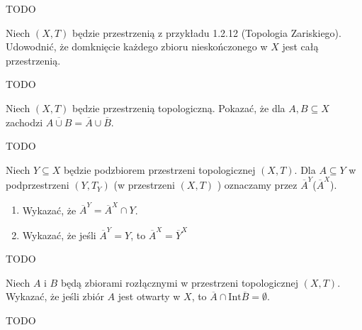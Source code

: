 \begin{solution}
	TODO
\end{solution} 
\begin{problem}[1.20]
	Niech $\left( X, T \right) $ będzie przestrzenią z przykładu 1.2.12 (Topologia Zariskiego). Udowodnić, że domknięcie każdego zbioru nieskończonego w $X$ jest całą przestrzenią.
\end{problem} 
\begin{solution}
	TODO
\end{solution} 
\begin{problem}[1.21]
	Niech $\left( X,T \right) $ będzie przestrzenią topologiczną. Pokazać, że dla $A,B \subseteq X$ zachodzi $\overline{A\cup B} = \overline{A} \cup \overline{B}$.
\end{problem} 
\begin{solution}
	TODO
\end{solution} 
\begin{problem}[1.22]
	Niech $Y \subseteq X$ będzie podzbiorem przestrzeni topologicznej $\left( X,T \right) $. Dla $A \subseteq Y$ w podprzestrzeni $\left( Y, T_{Y} \right) $ (w przestrzeni $\left( X,T \right) $ ) oznaczamy przez $\overline{A}^{Y}$($\overline{A}^{X}$).
	\begin{enumerate}[label=\alph*)]
		\item Wykazać, że $\overline{A}^{Y} = \overline{A}^{X}\cap Y$.
		\item Wykazać, że jeśli $\overline{A}^{Y} = Y$, to $\overline{A}^{X} = \overline{Y}^{X}$
	\end{enumerate}
\end{problem} 
\begin{solution}
	TODO
\end{solution} 
\begin{problem}[1.23]
	Niech $A$ i $B$ będą zbiorami rozłącznymi w przestrzeni topologicznej $\left( X,T \right) $. Wykazać, że jeśli zbiór $A$ jest otwarty w $X$, to $\overline{A}\cap \text{Int}\overline{B} = \emptyset$.
\end{problem} 
\begin{solution}
	TODO
\end{solution} 
